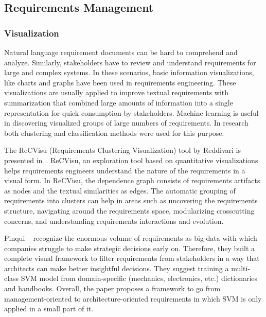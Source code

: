 \subsection{Requirements Management}

\subsubsection{Visualization}

Natural language requirement documents can be hard to comprehend and analyze. Similarly, stakeholders have to review and understand requirements for large and complex systems.  In these scenarios, basic information visualizations, like charts and graphs have been used in requirements engineering. These visualizations are usually applied to improve textual requirements with summarization that combined large amounts of information into a single representation for quick consumption by stakeholders\cite{Reddivari:2012}. Machine learning is useful in discovering visualized groups of large numbers of requirements. In research both clustering and classification methods were used for this purpose.

The ReCVisu (Requirements Clustering Visualization) tool by Reddivari
\etal is presented in~\cite{Reddivari:2012}. ReCVisu, an exploration tool based
on quantitative visualizations helps requirements engineers understand the nature
of the requirements in a visual form. In ReCVisu, the dependence graph consists
of requirements artifacts as nodes and the textual similarities as edges. The
automatic grouping of requirements into clusters can help in areas such as
uncovering the requirements structure, navigating around the requirements space,
modularizing crosscutting concerns, and understanding requirements interactions
and evolution.

Pinqui \etal~\cite{Pinqui:2015} recognize the enormous volume of requirements as
big data with which companies struggle to make strategic decisions early on.
Therefore, they built a complete visual framework to filter requirements from
stakeholders in a way that architects can make better insightful decisions. They
suggest training a multi-class SVM model from domain-specific (mechanics,
electronics, etc.) dictionaries and handbooks. Overall, the paper proposes a
framework to go from management-oriented to architecture-oriented
requirements in which SVM is only applied in a small part of it.

